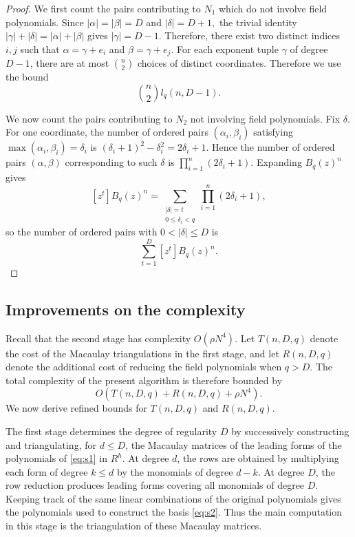 \documentclass[a4paper, 12pt, oneside, openright]{article}
\begin{document}
\begin{proof}
We first count the pairs contributing to $N_1$ which do not involve field polynomials. Since $|\alpha|=|\beta|=D$ and $|\delta|=D+1,$ the trivial identity $|\gamma|+|\delta|=|\alpha|+|\beta|$ gives $|\gamma|=D-1.$
Therefore, there exist two distinct indices $i,j$ such that %
$\alpha=\gamma+e_i$ and $\beta=\gamma+e_j$.
For each exponent tuple $\gamma$ of degree $D-1$, there are at most $\binom n2$ choices of distinct coordinates. Therefore we use the bound
\[
\binom n2 l_q(n,D-1).
\]


We now count the pairs contributing to $N_2$ not involving field polynomials. Fix $\delta.$
For one coordinate, the number of ordered pairs $(\alpha_i,\beta_i)$ satisfying $\max(\alpha_i,\beta_i)=\delta_i $ is $(\delta_i+1)^2-\delta_i^2=2\delta_i+1.$
Hence the number of ordered pairs $(\alpha,\beta)$ corresponding to such $\delta$ is $\prod_{i=1}^{n}(2\delta_i+1).$
Expanding $B_q(z)^n$ gives
\[
[z^t]B_q(z)^n=
\sum_{\substack{
|\delta|=t\\
0\leq\delta_i<q
}}
\prod_{i=1}^{n}(2\delta_i+1),
\]
so the number of ordered pairs with $0<|\delta|\leq D$ is
\[
\sum_{t=1}^{D}[z^t]B_q(z)^n.
\]
\end{proof}

\subsection{Improvements on the complexity}
\label{sec:newCompl}

Recall that the second stage has complexity $O(\rho N^4)$.
Let $T(n,D,q)$ denote the cost of the Macaulay triangulations in the first stage, and let $R(n,D,q)$ denote the additional cost of reducing the field polynomials when $q>D$.
The total complexity of the present algorithm is therefore bounded by
\begin{equation}
\label{total_complexity}
O\left(
T(n,D,q)+R(n,D,q)+\rho N^4
\right).
\end{equation}
We now derive refined bounds for $T(n,D,q)$ and $R(n,D,q)$.

The first stage determines the degree of regularity $D$ by successively constructing and triangulating, for $d\le D$, the Macaulay matrices of the leading forms of the polynomials of \eqref{eq:s1} in $R^h$. At degree $d$, the rows are obtained by multiplying each form of degree $k\le d$ by the monomials of degree $d-k$. At degree $D$, the row reduction produces leading forms covering all monomials of degree $D$. Keeping track of the same linear combinations of the original polynomials gives the polynomials used to construct the basis \eqref{eq:s2}. Thus the main computation in this stage is the triangulation of these Macaulay matrices.
\end{document}
